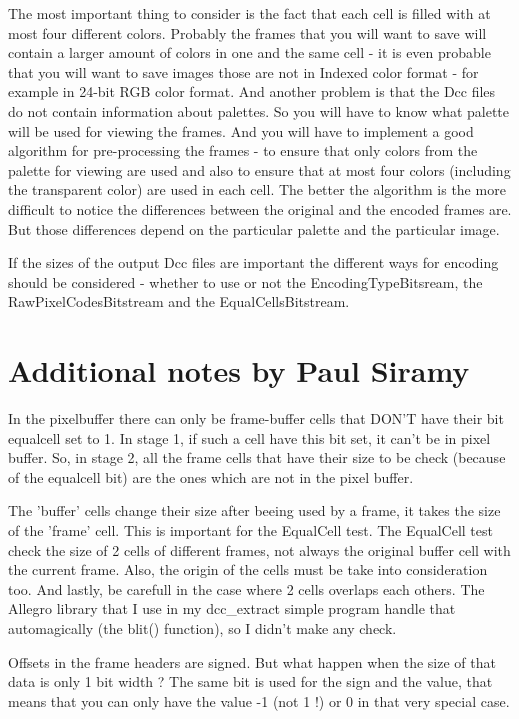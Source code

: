 The most important thing to consider is the fact that each cell is filled with at most four different colors. Probably the frames that you will want to save will contain a larger amount of colors in one and the same cell - it is even probable that you will want to save images those are not in Indexed color format - for example in 24-bit RGB color format. And another problem is that the Dcc files do not contain information about palettes. So you will have to know what palette will be used for viewing the frames. And you will have to implement a good algorithm for pre-processing the frames - to ensure that only colors from the palette for viewing are used and also to ensure that at most four colors (including the transparent color) are used in each cell. The better the algorithm is the more difficult to notice the differences between the original and the encoded frames are. But those differences depend on the particular palette and the particular image.

If the sizes of the output Dcc files are important the different ways for encoding should be considered - whether to use or not the EncodingTypeBitsream, the RawPixelCodesBitstream and the EqualCellsBitstream.

\section{Additional notes by Paul Siramy}
In the pixelbuffer there can only be frame-buffer cells that DON'T have their bit equalcell set to 1. In stage 1, if such a cell have this bit set, it can't be in pixel buffer. So, in stage 2, all the frame cells that have their size to be check (because of the equalcell bit) are the ones which are not in the pixel buffer.

The 'buffer' cells change their size after beeing used by a frame, it takes the size of the 'frame' cell. This is important for the EqualCell test. The EqualCell test check the size of 2 cells of different frames, not always the original buffer cell with the current frame. Also, the origin of the cells must be take into consideration too. And lastly, be carefull in the case where 2 cells overlaps each others. The Allegro library that I use in my dcc_extract simple program handle that automagically (the blit() function), so I didn't make any check.

Offsets in the frame headers are signed. But what happen when the size of that data is only 1 bit width ? The same bit is used for the sign and the value, that means that you can only have the value -1 (not 1 !) or 0 in that very special case.

